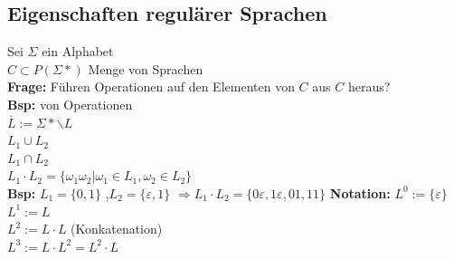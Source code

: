 \documentclass[a4paper,10pt,landscape,twocolumn]{article}
\newcommand{\Bold}[1]{\textbf{#1}} %
\begin{document}
\subsection{Eigenschaften regul\"arer Sprachen}
Sei $\Sigma$ ein Alphabet\\
$C\subset P(\Sigma*)$ Menge von Sprachen\\
\Bold{Frage:} F\"uhren Operationen auf den Elementen von $C$ aus $C$ heraus?\\
\Bold{Bsp:} von Operationen\\
$\overline{L}:=\Sigma*\backslash L$\\
$L_1\cup L_2$\\
$L_1 \cap L_2$\\
$L_1\cdot L_2=\{\omega_1\omega_2|\omega_1\in L_1,\omega_2\in L_2\}$\\
\Bold{Bsp:} $L_1 =\{0,1\}$ ,$L_2 =\{\varepsilon,1\}$ $\Rightarrow L_1\cdot L_2 = \{0\varepsilon, 1\varepsilon,01,11\}$
\Bold{Notation:}
$L^0:=\{\varepsilon\}$\\
$L^1:= L$\\
$L^2:= L\cdot L$ (Konkatenation)\\ 
$L^3:= L\cdot L^2 = L^2\cdot L$
\end{document}
